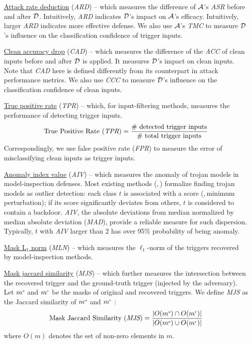 \documentclass[compsoc,conference,a4paper,10pt,times]{IEEEtran}
\newcommand{\asr}{{\em \small ASR}\xspace}
\newcommand{\cad}{{\em \small CAD}\xspace}
\newcommand{\tmc}{{\em \small TMC}\xspace}
\newcommand{\ccc}{{\em \small CCC}\xspace}
\newcommand{\acc}{{\em \small ACC}\xspace}
\newcommand{\ard}{{\em \small ARD}\xspace}
\newcommand{\tpr}{{\em \small TPR}\xspace}
\newcommand{\fpr}{{\em \small FPR}\xspace}
\newcommand{\mln}{{\em \small MLN}\xspace}
\newcommand{\mad}{{\em \small MAD}\xspace}
\newcommand{\mjs}{{\em \small MJS}\xspace}
\newcommand{\anidx}{{\em \small AIV}\xspace}
\begin{document}
\vspace{1pt}
{\underline{Attack rate deduction}} (\ard) -- which measures the difference of ${\mathcal{A}}$'s \asr before and after ${\mathcal{D}}$. Intuitively, \ard indicates ${\mathcal{D}}$'s impact on ${\mathcal{A}}$'s efficacy. Intuitively, larger \ard indicates more effective defense. We also use ${\mathcal{A}}$'s \tmc to measure ${\mathcal{D}}$'s influence on the classification confidence of trigger inputs.


\vspace{1pt}
{\underline{Clean accuracy drop}} (\cad) -- which measures the difference of the \acc of clean inputs before and after ${\mathcal{D}}$ is applied. It measures ${\mathcal{D}}$'s impact on clean inputs. Note that \cad here is defined differently from its counterpart in attack performance metrics. We also use \ccc to measure ${\mathcal{D}}$'s influence on the classification confidence of clean inputs.


\vspace{1pt}
{\underline{True positive rate}} (\tpr) -- which, for input-filtering methods, measures the performance of detecting trigger inputs.
\begin{align}
\text{\small True Positive Rate (\tpr)} = \frac{\textrm{\small \# detected trigger inputs}}{\textrm{\small \# total trigger inputs}}
\end{align}
Correspondingly, we use false positive rate (\fpr) to measure the error of misclassifying clean inputs as trigger inputs.

\vspace{1pt}
{\underline{Anomaly index value}} (\anidx) -- which measures the anomaly of trojan models in model-inspection defenses. Most existing methods (\meg,\,) formalize finding trojan models as outlier detection: each class $t$ is associated with a score (\meg,\,minimum perturbation); if its score significantly deviates from others, $t$ is considered to contain a backdoor. \anidx, the absolute deviations from median normalized by median absolute deviation (\mad), provide a reliable measure for such dispersion. Typically, $t$ with \anidx larger than 2 has over 95\% probability of being anomaly.

\vspace{1pt}
{\underline{Mask L$_1$ norm}} (\mln) -- which measures the $\ell_1$-norm of the triggers recovered by model-inspection methods.



\vspace{1pt}
{\underline{Mask jaccard similarity}} (\mjs) -- which further measures the intersection between the recovered trigger and the ground-truth trigger (injected by the adversary). Let $\ssup{m}{o}$ and $\ssup{m}{r}$ be the masks of original and recovered triggers. We define \mjs as the Jaccard similarity of $\ssup{m}{o}$ and $\ssup{m}{r}$ :
\begin{align}
\text{\small Mask Jaccard Similarity (\mjs)} = \frac{| O(\ssup{m}{o}) \cap O(\ssup{m}{r})|}{|O(\ssup{m}{o}) \cup O(\ssup{m}{r})|}
\end{align}
where $O(m)$ denotes the set of non-zero elements in $m$.
\end{document}

